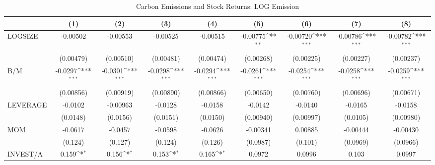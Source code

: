 \begin{table}[htbp]\centering
\def\sym#1{\ifmmode^{#1}\else\(^{#1}\)\fi}
\caption{Carbon Emissions and Stock Returns: LOG Emission}
\begin{tabular}{l*{8}{c}}
\hline\hline
                    &\multicolumn{1}{c}{(1)}         &\multicolumn{1}{c}{(2)}         &\multicolumn{1}{c}{(3)}         &\multicolumn{1}{c}{(4)}         &\multicolumn{1}{c}{(5)}         &\multicolumn{1}{c}{(6)}         &\multicolumn{1}{c}{(7)}         &\multicolumn{1}{c}{(8)}         \\
\hline
LOGSIZE             &    -0.00502         &    -0.00553         &    -0.00525         &    -0.00515         &    -0.00775\sym{**} &    -0.00720\sym{***}&    -0.00786\sym{***}&    -0.00782\sym{***}\\
                    &   (0.00479)         &   (0.00510)         &   (0.00481)         &   (0.00474)         &   (0.00268)         &   (0.00225)         &   (0.00227)         &   (0.00237)         \\
B/M                 &     -0.0297\sym{***}&     -0.0301\sym{***}&     -0.0298\sym{***}&     -0.0294\sym{***}&     -0.0261\sym{***}&     -0.0254\sym{***}&     -0.0258\sym{***}&     -0.0259\sym{***}\\
                    &   (0.00856)         &   (0.00919)         &   (0.00890)         &   (0.00866)         &   (0.00650)         &   (0.00760)         &   (0.00696)         &   (0.00671)         \\
LEVERAGE            &     -0.0102         &    -0.00963         &     -0.0128         &     -0.0158         &     -0.0142         &     -0.0140         &     -0.0165         &     -0.0158         \\
                    &    (0.0148)         &    (0.0156)         &    (0.0151)         &    (0.0150)         &   (0.00940)         &   (0.00997)         &    (0.0105)         &   (0.00980)         \\
MOM                 &     -0.0617         &     -0.0457         &     -0.0598         &     -0.0626         &    -0.00341         &     0.00885         &    -0.00444         &    -0.00430         \\
                    &     (0.124)         &     (0.127)         &     (0.124)         &     (0.126)         &    (0.0987)         &     (0.101)         &    (0.0969)         &    (0.0966)         \\
INVEST/A            &       0.159\sym{*}  &       0.156\sym{*}  &       0.153\sym{*}  &       0.165\sym{*}  &      0.0972         &      0.0996         &       0.103         &      0.0997         \\

\end{tabular}
\end{table}
